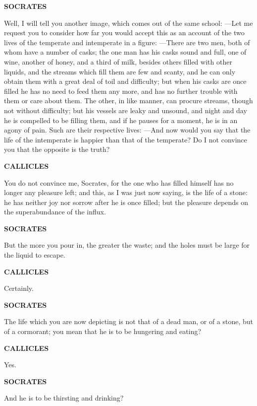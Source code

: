 \documentclass[11pt,letter]{article}
\begin{document}
\par \textbf{SOCRATES}
\par   Well, I will tell you another image, which comes out of the same school: —Let me request you to consider how far you would accept this as an account of the two lives of the temperate and intemperate in a figure: —There are two men, both of whom have a number of casks; the one man has his casks sound and full, one of wine, another of honey, and a third of milk, besides others filled with other liquids, and the streams which fill them are few and scanty, and he can only obtain them with a great deal of toil and difficulty; but when his casks are once filled he has no need to feed them any more, and has no further trouble with them or care about them. The other, in like manner, can procure streams, though not without difficulty; but his vessels are leaky and unsound, and night and day he is compelled to be filling them, and if he pauses for a moment, he is in an agony of pain. Such are their respective lives: —And now would you say that the life of the intemperate is happier than that of the temperate? Do I not convince you that the opposite is the truth?

\par \textbf{CALLICLES}
\par   You do not convince me, Socrates, for the one who has filled himself has no longer any pleasure left; and this, as I was just now saying, is the life of a stone:  he has neither joy nor sorrow after he is once filled; but the pleasure depends on the superabundance of the influx.

\par \textbf{SOCRATES}
\par   But the more you pour in, the greater the waste; and the holes must be large for the liquid to escape.

\par \textbf{CALLICLES}
\par   Certainly.

\par \textbf{SOCRATES}
\par   The life which you are now depicting is not that of a dead man, or of a stone, but of a cormorant; you mean that he is to be hungering and eating?

\par \textbf{CALLICLES}
\par   Yes.

\par \textbf{SOCRATES}
\par   And he is to be thirsting and drinking?
\end{document}
